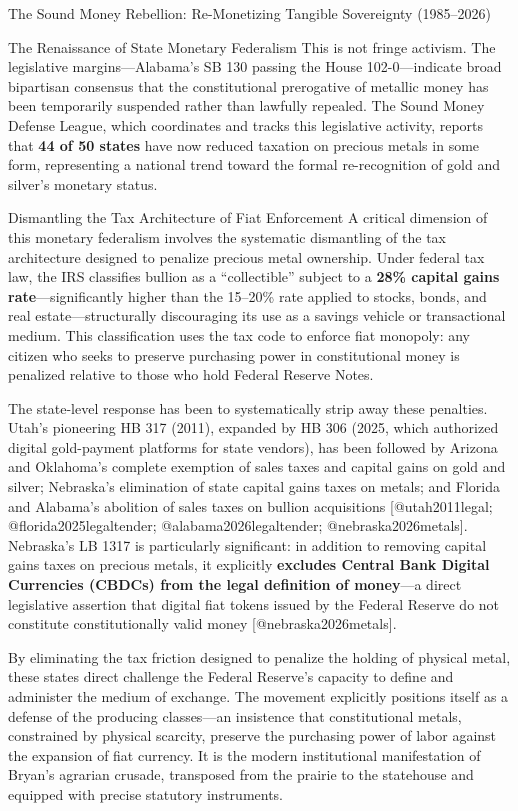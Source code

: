 \documentclass[
  ignorenonframetext,
]{beamer}
\begin{document}
\begin{frame}{The Sound Money Rebellion: Re-Monetizing Tangible
Sovereignty (1985--2026)}
\begin{block}{The Renaissance of State Monetary Federalism}
This is not fringe activism. The legislative margins---Alabama's SB 130
passing the House 102-0---indicate broad bipartisan consensus that the
constitutional prerogative of metallic money has been temporarily
suspended rather than lawfully repealed. The Sound Money Defense League,
which coordinates and tracks this legislative activity, reports that
\textbf{44 of 50 states} have now reduced taxation on precious metals in
some form, representing a national trend toward the formal
re-recognition of gold and silver's monetary status.
\end{block}

\begin{block}{Dismantling the Tax Architecture of Fiat Enforcement}
\protect{}\label{dismantling-the-tax-architecture-of-fiat-enforcement}
A critical dimension of this monetary federalism involves the systematic
dismantling of the tax architecture designed to penalize precious metal
ownership. Under federal tax law, the IRS classifies bullion as a
``collectible'' subject to a \textbf{28\% capital gains
rate}---significantly higher than the 15--20\% rate applied to stocks,
bonds, and real estate---structurally discouraging its use as a savings
vehicle or transactional medium. This classification uses the tax code
to enforce fiat monopoly: any citizen who seeks to preserve purchasing
power in constitutional money is penalized relative to those who hold
Federal Reserve Notes.

The state-level response has been to systematically strip away these
penalties. Utah's pioneering HB 317 (2011), expanded by HB 306 (2025,
which authorized digital gold-payment platforms for state vendors), has
been followed by Arizona and Oklahoma's complete exemption of sales
taxes and capital gains on gold and silver; Nebraska's elimination of
state capital gains taxes on metals; and Florida and Alabama's abolition
of sales taxes on bullion acquisitions {[}@utah2011legal;
@florida2025legaltender; @alabama2026legaltender;
@nebraska2026metals{]}. Nebraska's LB 1317 is particularly significant:
in addition to removing capital gains taxes on precious metals, it
explicitly \textbf{excludes Central Bank Digital Currencies (CBDCs) from
the legal definition of money}---a direct legislative assertion that
digital fiat tokens issued by the Federal Reserve do not constitute
constitutionally valid money {[}@nebraska2026metals{]}.

By eliminating the tax friction designed to penalize the holding of
physical metal, these states direct challenge the Federal Reserve's
capacity to define and administer the medium of exchange. The movement
explicitly positions itself as a defense of the producing classes---an
insistence that constitutional metals, constrained by physical scarcity,
preserve the purchasing power of labor against the expansion of fiat
currency. It is the modern institutional manifestation of Bryan's
agrarian crusade, transposed from the prairie to the statehouse and
equipped with precise statutory instruments.
\end{block}


\end{frame}
\end{document}
